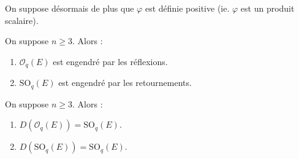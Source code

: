   On suppose désormais de plus que $\varphi$ est définie positive (ie. $\varphi$ est un produit scalaire).

  \begin{theorem}
    On suppose $n \geq 3$. Alors :
    \begin{enumerate}[label={\bfseries(\roman*)}]
      \item $\mathcal{O}_q(E)$ est engendré par les réflexions.
      \item $\mathrm{SO}_q(E)$ est engendré par les retournements.
    \end{enumerate}
  \end{theorem}

  \begin{application}
    On suppose $n \geq 3$. Alors :
    \begin{enumerate}[label={\bfseries(\roman*)}]
      \item $D(\mathcal{O}_q(E)) = \mathrm{SO}_q(E)$.
      \item $D(\mathrm{SO}_q(E)) = \mathrm{SO}_q(E)$.
    \end{enumerate}
  \end{application}

